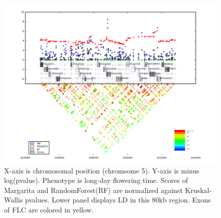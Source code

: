 \documentclass[a4paper,10pt]{article}
\begin{document}
\begin{figure}
  \includegraphics[width=1\textwidth]{figures/phenotype_1_LD_rank_12_snp_5_3188328_list_type_28_FT_list3_gene_830876_AT5G10120.png}
  \caption{X-axis is chromosomal position (chromsome 5). Y-axis is minus log(pvalue). Phenotype is long-day flowering time. Scores of Margarita and RandomForest(RF) are normalized against Kruskal-Wallis pvalues. Lower panel displays LD in this 80kb region. Exons of FLC are colored in yellow.}\label{f8}
\end{figure}






\end{document}
